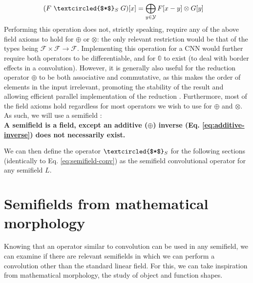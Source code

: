 \documentclass[a4paper, 12pt]{report}
\begin{document}
\begin{align}
	(F ~\textcircled{$*$}_S\; G)[x] &=\bigoplus_{y\in \mathcal{Y}} F[x-y] \otimes G[y] \label{eq:semifield-conv}
\end{align}
\noindent
Performing this operation does not, strictly speaking, require any of the above field axioms to hold for $\oplus$ or $\otimes$: the only relevant restriction would be that of the types being $\mathcal{F}\times\mathcal{F}\rightarrow\mathcal{F}$. Implementing this operation for a CNN would further require both operators to be differentiable, and for $\mathbb{0}$ to exist (to deal with border effects in a convolution). However, it is generally also useful for the reduction operator $\oplus$ to be both associative and commutative, as this makes the order of elements in the input irrelevant, promoting the stability of the result and allowing efficient parallel implementation of the reduction \cite{ppad}. Furthermore, most of the field axioms hold regardless for most operators we wish to use for $\oplus$ and $\otimes$. As such, we will use a semifield \cite{bellaardaxiomatic}:\\
\textbf{
A semifield is a field, except an additive ($\oplus$) inverse (Eq. \ref{eq:additive-inverse}) does not necessarily exist.
}

We can then define the operator $\textcircled{$*$}_S$ for the following sections (identically to Eq. \ref{eq:semifield-conv}) as the semifield convolutional operator for any semifield $L$.

\section{Semifields from mathematical morphology}
Knowing that an operator similar to convolution can be used in any semifield, we can examine if there are relevant semifields in which we can perform a convolution other than the standard linear field. For this, we can take inspiration from mathematical morphology, the study of object and function shapes.
\end{document}
